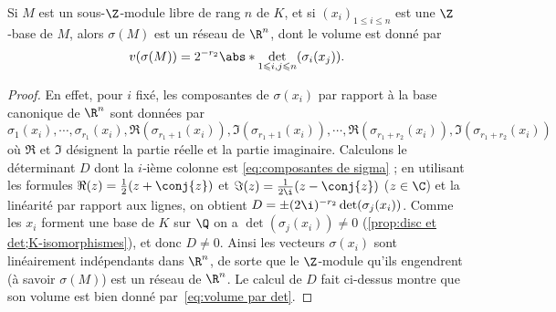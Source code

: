 \documentclass[11pt, useosf,
  title in boldface,
  theorem in new line,
  theorem numbering = section,
  number theorems separately,
]{simplivre}
\begin{document}
    \begin{proposition}\label{prop:volume par det}
        Si \( M \) est un sous-\( \Z \)‑module libre de rang \( n \) de \( K \), et si \( (x_i)_{1 \leqslant i \leqslant n} \) est une \( \Z \)‑base de \( M \), alors \( \sigma(M) \) est un réseau de \( \R^n \), dont le volume est donné par
        \begin{equation}\label{eq:volume par det}
            v(\sigma(M)) = 2^{-r_2} \abs*{\det_{1 \leqslant i,j \leqslant n} (\sigma_i(x_j))}.
        \end{equation}
    \end{proposition}
    \begin{proof}
        En effet, pour \( i \) fixé, les composantes de \( \sigma(x_i) \) par rapport à la base canonique de \( \R^n \) sont données par
        \begin{equation}\label{eq:composantes de sigma}
            \sigma_1(x_i), \cdots, \sigma_{r_1}(x_i), \Re(\sigma_{r_1+1}(x_i)), \Im(\sigma_{r_1+1}(x_i)), \cdots, \Re(\sigma_{r_1+r_2}(x_i)), \Im(\sigma_{r_1+r_2}(x_i))
        \end{equation}
        où \( \Re \) et \( \Im \) désignent la partie réelle et la partie imaginaire. Calculons le déterminant \( D \) dont la \( i \)‑ième colonne est \eqref{eq:composantes de sigma} ; en utilisant les formules \( \Re(z) = \frac{1}{2}(z+\conj{z}) \) et \( \Im(z) = \frac{1}{2\i}(z-\conj{z}) \) (\( z \in \C \)) et la linéarité par rapport aux lignes, on obtient \( D = \pm (2\i)^{-r_2} \det(\sigma_j(x_i)) \). Comme les \( x_i \) forment une base de \( K \) sur \( \Q \) on a \( \det(\sigma_j(x_i)) \neq 0 \) (\cref{prop:disc et det;K-isomorphismes}), et donc \( D \neq 0 \). Ainsi les vecteurs \( \sigma(x_i) \) sont linéairement indépendants dans \( \R^n \), de sorte que le \( \Z \)‑module qu'ils engendrent (à savoir \( \sigma(M) \)) est un réseau de \( \R^n \). Le calcul de \( D \) fait ci-dessus montre que son volume est bien donné par~\eqref{eq:volume par det}.
    \end{proof}
\end{document}
